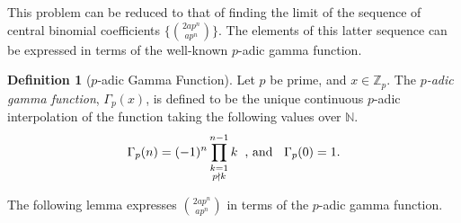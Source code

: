\documentclass[a0]{a0poster}
\newtheorem{lemma}{Lemma}
\theoremstyle{definition}
\newtheorem{definition}{Definition}
\newcommand{\Lim}[1]{\raisebox{0.5ex}{\scalebox{0.8}{$\displaystyle \lim_{#1}\;$}}}
\newcommand{\thlabel}[1]{\label{#1}}
\begin{document}
\begin{textblock}{7}


\noindent This problem can be reduced to that of finding the limit of the sequence of central binomial coefficients $\{{2ap^n \choose ap^n}\}$. 
The elements of this latter sequence can be expressed in terms of the well-known $p$-adic gamma function. 

\begin{definition}[$p$-adic Gamma Function]
Let $p$ be prime, and $x\in \mathbb{Z}_p$. The \textit{$p$-adic gamma function}, $\Gamma_p(x)$, is defined to be the unique continuous $p$-adic interpolation of the function taking the following values over $\mathbb{N}$.
$$\Gamma_p(n)=(-1)^n\prod_{\substack{k=1\\p\nmid k}}^{n-1} k \hspace{2mm}\text{, and }\hspace{2mm}  \Gamma_p(0)=1.$$
\end{definition}
The following lemma expresses ${2ap^n \choose ap^n}$ in terms of the $p$-adic gamma function.


\end{textblock}
\end{document}

